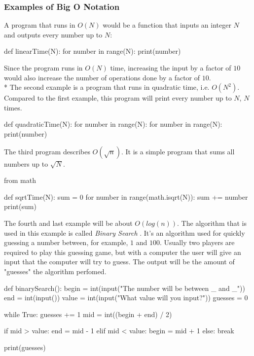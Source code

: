 \documentclass[main.tex]{subfiles}
\begin{document}
\subsubsection{Examples of Big O Notation}

A program that runs in $O(N)$ would be a function that inputs an integer $N$ and outputs every number up to $N$:
\begin{python}
def linearTime(N):
    for number in range(N):
        print(number)
\end{python}

Since the program runs in $O(N)$ time, increasing the input by a factor of $10$ would also increase the number of operations done by a factor of $10$.
\newline
\\*
The second example is a program that runs in quadratic time, i.e. $O(N^{2})$. Compared to the first example, this program will print every number up to $N$, $N$ times.

\begin{python}
    def quadraticTime(N):
        for number in range(N):
            for number in range(N):
                print(number)
\end{python}

\vspace{10mm}

The third program describes $O(\sqrt{n})$. It is a simple program that sums all numbers up to $\sqrt{N}$.

\begin{python}
    from math

    def sqrtTime(N):
        sum = 0
        for number in range(math.isqrt(N)):
            sum += number
        print(sum)
\end{python}

\vspace{10mm}

The fourth and last example will be about $O(log (n))$. The algorithm that is used in this example is called \textit{Binary Search} \cite{binary_search}. It's an algorithm used for quickly guessing a number between, for example, $1$ and $100$. Usually two players are required to play this guessing game, but with a computer the user will give an input that the computer will try to guess. The output will be the amount of "guesses" the algorithm perfomed.

\begin{python}
    def binarySearch():
        begin = int(input("The number will be between _ and _\n"))
        end = int(input())
        value = int(input("What value will you input?\n"))
        guesses = 0

        while True:
            guesses += 1
            mid = int((begin + end) / 2)

            if mid > value:
                end = mid - 1
            elif mid < value:
                begin = mid + 1
            else:
                break

    print(guesses)

\end{python}

\end{document}
